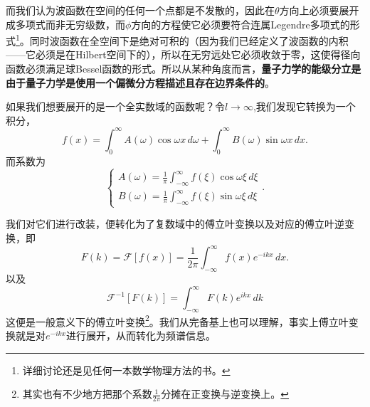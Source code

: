 \documentclass[12pt,a4paper,openany,twoside]{book}
\numberwithin{equation}{section}
\begin{document}
而我们认为波函数在空间的任何一个点都是不发散的，因此在$\theta$方向上必须要展开成多项式而非无穷级数，而$\phi$方向的方程使它必须要符合连属Legendre多项式的形式\footnote{详细讨论还是见任何一本数学物理方法的书。}。同时波函数在全空间下是绝对可积的（因为我们已经定义了波函数的内积——它必须是在Hilbert空间下的），所以在无穷远处它必须收敛于零，这使得径向函数必须满足球Bessel函数的形式。所以从某种角度而言，\textbf{量子力学的能级分立是由于量子力学是使用一个偏微分方程描述且存在边界条件的}。

如果我们想要展开的是一个全实数域的函数呢？令$l \to \infty$,我们发现它转换为一个积分，
\begin{equation}
  f(x) = \int _0 ^\infty A(\omega) \cos{\omega x} \, d\omega + \int _0 ^\infty B(\omega) \sin{\omega x} \, dx  
.
\end{equation}
而系数为
\begin{equation}
\begin{cases}
  A(\omega) = \frac{1}{\pi} \int ^\infty _{-\infty} f(\xi) \cos{\omega \xi} \, d\xi \\
  B(\omega) = \frac{1}{\pi} \int ^\infty _{-\infty} f(\xi) \sin{\omega \xi}\, d\xi 
\end{cases}
.
\end{equation}

我们对它们进行改装，便转化为了复数域中的傅立叶变换以及对应的傅立叶逆变换，即
\begin{equation}
F(k) =  \mathcal{F} [f(x)] = \frac{1}{2\pi}\int_{-\infty}^{\infty} f(x) e^{-ikx} \, dx 
.
\end{equation}
以及
\begin{equation}
  \mathcal{F}^{-1} [F(k)] = \int_{-\infty} ^\infty F(k) e^{ikx} \, dk
\end{equation}
 这便是一般意义下的傅立叶变换\footnote{其实也有不少地方把那个系数$\frac{1}{2\pi}$分摊在正变换与逆变换上。}。我们从完备基上也可以理解，事实上傅立叶变换就是对$e^{-ikx}$进行展开，从而转化为频谱信息。
\end{document}
